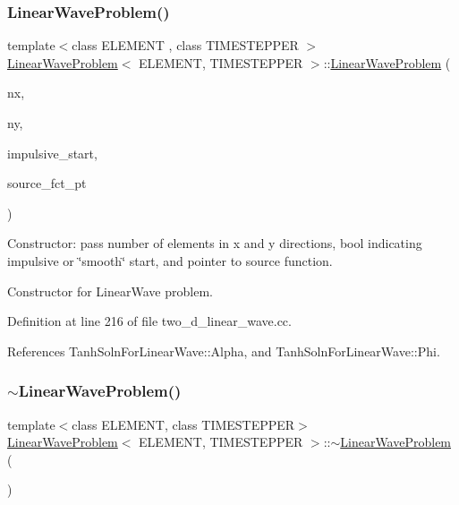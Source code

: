 \subsubsection{\texorpdfstring{Linear\+Wave\+Problem()}{LinearWaveProblem()}\hspace{0.1cm}{\footnotesize\ttfamily [1/2]}}
{\footnotesize\ttfamily template$<$class E\+L\+E\+M\+E\+NT , class T\+I\+M\+E\+S\+T\+E\+P\+P\+ER $>$ \\
\hyperlink{classLinearWaveProblem}{Linear\+Wave\+Problem}$<$ E\+L\+E\+M\+E\+NT, T\+I\+M\+E\+S\+T\+E\+P\+P\+ER $>$\+::\hyperlink{classLinearWaveProblem}{Linear\+Wave\+Problem} (\begin{DoxyParamCaption}\item[{const unsigned \&}]{nx,  }\item[{const unsigned \&}]{ny,  }\item[{const bool \&}]{impulsive\+\_\+start,  }\item[{Linear\+Wave\+Equations$<$ 2 $>$\+::Linear\+Wave\+Source\+Fct\+Pt}]{source\+\_\+fct\+\_\+pt }\end{DoxyParamCaption})}



Constructor\+: pass number of elements in x and y directions, bool indicating impulsive or \char`\"{}smooth\char`\"{} start, and pointer to source function. 

Constructor for Linear\+Wave problem. 

Definition at line 216 of file two\+\_\+d\+\_\+linear\+\_\+wave.\+cc.



References Tanh\+Soln\+For\+Linear\+Wave\+::\+Alpha, and Tanh\+Soln\+For\+Linear\+Wave\+::\+Phi.

\mbox{\label{classLinearWaveProblem_af1f3879114813b0acdfd2567c5c7b1e9}} 
\subsubsection{\texorpdfstring{$\sim$\+Linear\+Wave\+Problem()}{~LinearWaveProblem()}\hspace{0.1cm}{\footnotesize\ttfamily [1/2]}}
{\footnotesize\ttfamily template$<$class E\+L\+E\+M\+E\+NT, class T\+I\+M\+E\+S\+T\+E\+P\+P\+ER$>$ \\
\hyperlink{classLinearWaveProblem}{Linear\+Wave\+Problem}$<$ E\+L\+E\+M\+E\+NT, T\+I\+M\+E\+S\+T\+E\+P\+P\+ER $>$\+::$\sim$\hyperlink{classLinearWaveProblem}{Linear\+Wave\+Problem} (\begin{DoxyParamCaption}{ }\end{DoxyParamCaption})\hspace{0.3cm}{\ttfamily [inline]}}



